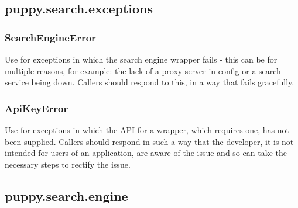 \documentclass[letterpaper,10pt,english]{sphinxmanual}
\begin{document}
\subsection{puppy.search.exceptions}
\label{api3.0:module-puppy.search.exceptions}\label{api3.0:puppy-search-exceptions}

\subsubsection{SearchEngineError}
\label{api3.0:searchengineerror}

\begin{fulllineitems}
\label{api3.0:puppy.search.exceptions.SearchEngineError}
Use for exceptions in which the search engine wrapper fails - this can be for multiple reasons, 
for example: the lack of a proxy server in config or a search service being down. Callers should respond
to this, in a way that fails gracefully.

\end{fulllineitems}



\subsubsection{ApiKeyError}
\label{api3.0:apikeyerror}

\begin{fulllineitems}
\label{api3.0:puppy.search.exceptions.ApiKeyError}
Use for exceptions in which the API for a wrapper, which requires one, has not been supplied. Callers should
respond in such a way that the developer, it is not intended for users of an application, are aware of the issue
and so can take the necessary steps to rectify the issue.

\end{fulllineitems}



\subsection{puppy.search.engine}
\label{api3.0:puppy-search-engine}\label{api3.0:module-puppy.search.engine}
\end{document}
